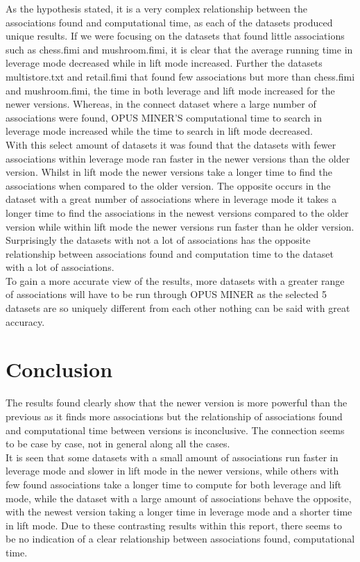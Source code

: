 \documentclass[10pt,a4paper]{article}
\begin{document}
 As the hypothesis stated, it is a very complex relationship between the associations found and computational time, as each of the datasets produced unique results. If we were focusing on the datasets that found little associations such as chess.fimi and mushroom.fimi, it is clear that the average running time in leverage mode decreased while in lift mode increased. Further the datasets multistore.txt and retail.fimi that found few associations but more than chess.fimi and mushroom.fimi, the time in both leverage and lift mode increased for the newer versions. Whereas, in the connect dataset where a large number of associations were found, OPUS MINER'S computational time to search in leverage mode increased while the time to search in lift mode decreased.\\
With this select amount of datasets it was found that the datasets with fewer associations within leverage mode ran faster in the newer versions than the older version. Whilst in lift mode the newer versions take a longer time to find the associations when compared to the older version. The opposite occurs in the dataset with a great number of associations where in leverage mode it takes a longer time to find the associations in the newest versions compared to the older version while within lift mode the newer versions run faster than he older version. Surprisingly the datasets with not a lot of associations has the opposite relationship between associations found and computation time to the dataset with a lot of associations.\\
To gain a more accurate view of the results, more datasets with a greater range of associations will have to be run through OPUS MINER as the selected 5 datasets are so uniquely different from each other nothing can be said with great accuracy.



\section{Conclusion}
The results found clearly show that the newer version is more powerful than the previous as it finds more associations but the relationship of associations found and computational time between versions is inconclusive. The connection seems to be case by case, not in general along all the cases.\\
It is seen that some datasets with a small amount of associations run faster in leverage mode and slower in lift mode in the newer versions, while others with few found associations take a longer time to compute for both leverage and lift mode, while the dataset with a large amount of associations behave the opposite, with the newest version taking a longer time in leverage mode and a shorter time in lift mode. Due to these contrasting results within this report, there seems to be no indication of a clear relationship between associations found, computational time.\\
\end{document}

